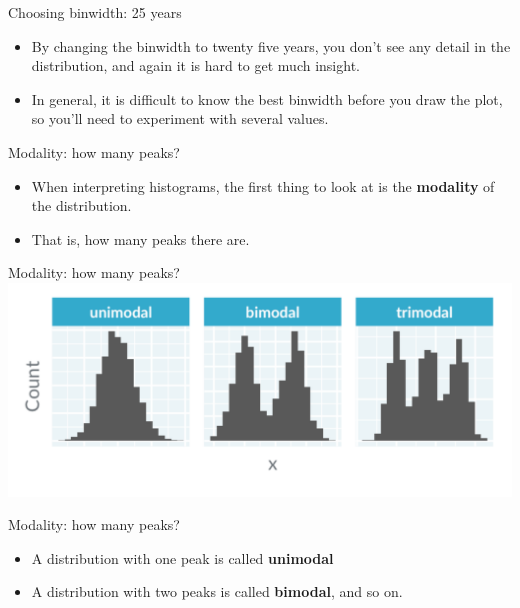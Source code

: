 \documentclass[
  ignorenonframetext,
]{beamer}
\begin{document}
\begin{frame}{Choosing binwidth: 25 years}
\label{choosing-binwidth-25-years-1}
\begin{itemize}
\item
  By changing the binwidth to twenty five years, you don't see any
  detail in the distribution, and again it is hard to get much insight.
\item
  In general, it is difficult to know the best binwidth before you draw
  the plot, so you'll need to experiment with several values.
\end{itemize}
\end{frame}

\begin{frame}{Modality: how many peaks?}
\label{modality-how-many-peaks}
\begin{itemize}
\item
  When interpreting histograms, the first thing to look at is the
  \textbf{modality} of the distribution.
\item
  That is, how many peaks there are.
\end{itemize}
\end{frame}

\begin{frame}{Modality: how many peaks?}
\label{modality-how-many-peaks-1}
\includegraphics{../images/im10.png}
\end{frame}

\begin{frame}{Modality: how many peaks?}
\label{modality-how-many-peaks-2}
\begin{itemize}
\item
  A distribution with one peak is called \textbf{unimodal}
\item
  A distribution with two peaks is called \textbf{bimodal}, and so on.
\end{itemize}
\end{frame}
\end{document}
